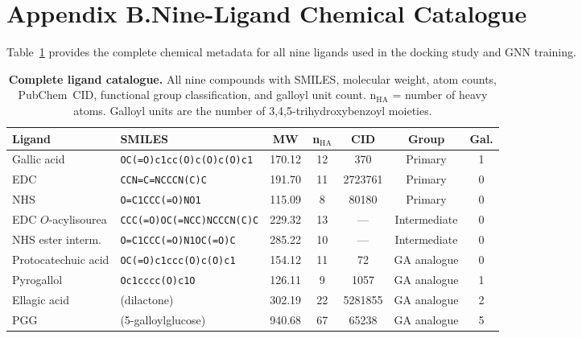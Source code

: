 \documentclass[11pt]{article}
\begin{document}
\section*{Appendix B.\quad Nine-Ligand Chemical Catalogue}
\label{app:ligands}

Table~\ref{tab:app_ligand_catalogue} provides the complete chemical
metadata for all nine ligands used in the docking study and GNN training.

\begin{table}[H]
\small
\centering
\caption{\textbf{Complete ligand catalogue.}
  All nine compounds with SMILES, molecular weight, atom counts,
  PubChem~CID, functional group classification, and galloyl unit count.
  n$_{\mathrm{HA}}$ = number of heavy atoms.
  Galloyl units are the number of 3,4,5-trihydroxybenzoyl moieties.}
\label{tab:app_ligand_catalogue}
\begin{tabular}{p{2.8cm}p{4.0cm}ccccc}
\toprule
\textbf{Ligand} & \textbf{SMILES} & \textbf{MW}
  & \textbf{n$_{\mathrm{HA}}$} & \textbf{CID}
  & \textbf{Group} & \textbf{Gal.} \\
\midrule
Gallic acid
  & \texttt{\footnotesize OC(=O)c1cc(O)c(O)c(O)c1}
  & 170.12 & 12 & 370 & Primary & 1 \\
EDC
  & \texttt{\footnotesize CCN=C=NCCCN(C)C}
  & 191.70 & 11 & 2723761 & Primary & 0 \\
NHS
  & \texttt{\footnotesize O=C1CCC(=O)NO1}
  & 115.09 &  8 & 80180 & Primary & 0 \\
EDC $O$-acylisourea
  & \texttt{\footnotesize CCC(=O)OC(=NCC)NCCCN(C)C}
  & 229.32 & 13 & --- & Intermediate & 0 \\
NHS ester interm.
  & \texttt{\footnotesize O=C1CCC(=O)N1OC(=O)C}
  & 285.22 & 10 & --- & Intermediate & 0 \\
Protocatechuic acid
  & \texttt{\footnotesize OC(=O)c1ccc(O)c(O)c1}
  & 154.12 & 11 & 72 & GA analogue & 0 \\
Pyrogallol
  & \texttt{\footnotesize Oc1cccc(O)c1O}
  & 126.11 &  9 & 1057 & GA analogue & 1 \\
Ellagic acid
  & (dilactone)
  & 302.19 & 22 & 5281855 & GA analogue & 2 \\
PGG
  & (5-galloylglucose)
  & 940.68 & 67 & 65238 & GA analogue & 5 \\
\bottomrule
\end{tabular}
\end{table}
\end{document}
